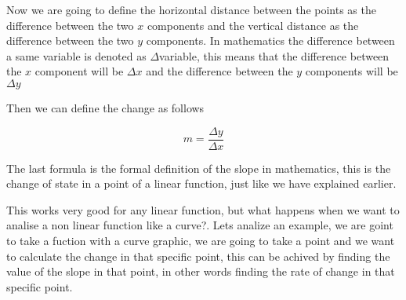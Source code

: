 \documentclass[12pt,journal]{IEEEtran}
\begin{document}
    Now we are going to define the horizontal distance between the points
    as the difference between the two $x$ components and the vertical distance as
    the difference between the two $y$ components. In mathematics the difference
    between a same variable is denoted as $\Delta$variable, this means that the
    difference between the $x$ component will be $\Delta x$ and the difference
    between the $y$ components will be $\Delta y$\\


    Then we can define the change as follows

    \begin{equation}
        m = \frac{\Delta y}{\Delta x}
    \end{equation}

    The last formula is the formal definition of the slope in mathematics, this
    is the change of state in a point of a linear function, just like we have
    explained earlier.

    This works very good for any linear function, but what happens when we
    want to analise a non linear function like a curve?. Lets analize an
    example, we are goint to take a fuction with a curve graphic, we are going to
    take a point and we want to calculate the change in that specific point,
    this can be achived by finding the value of the slope in that point, in other
    words finding the rate of change in that specific point.
\end{document}
